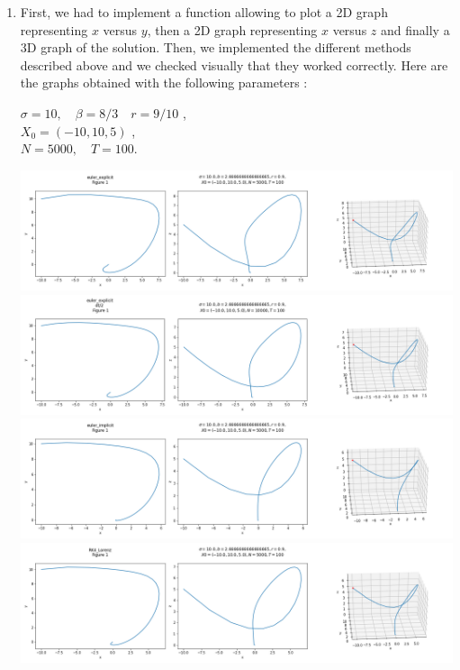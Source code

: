 \documentclass[12pt]{article}
\begin{document}
	\begin{enumerate}[label=\textbullet]
		\item First, we had to implement a function allowing to plot a 2D graph representing $x$ versus $y$, then a 2D graph representing $x$ versus $z$ and finally a 3D graph of the solution. Then, we implemented the different methods described above and we checked visually that they worked correctly. Here are the graphs obtained with the following parameters :
		\begin{center}
			$\sigma=10,\quad \beta=8/3 \quad r=9/10$ ,\\
			$X_0=(-10,10,5)$ ,\\
			$N=5000, \quad T=100 .$
		\end{center}
		\includegraphics[width=\textwidth]{"images/euler_explicit.png"}
		\includegraphics[width=\textwidth]{"images/euler_explicit_dt2.png"}
		\includegraphics[width=\textwidth]{"images/euler_implicit.png"}
		\includegraphics[width=\textwidth]{"images/RK4_Lorenz.png"}

\end{enumerate}
\end{document}
